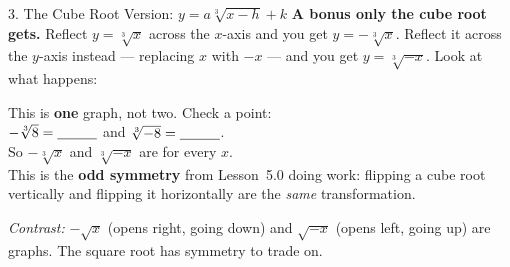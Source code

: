\documentclass[10pt]{article}
\newcommand{\lgrid}[4]{%
  \draw[step=1, linegray!40, very thin] (#1,#3) grid (#2,#4);
  \draw[->, semithick, charcoal] (#1,0)--(#2,0) node[below right, font=\scriptsize]{$x$};
  \draw[->, semithick, charcoal] (0,#3)--(0,#4) node[left, font=\scriptsize]{$y$};}
\newcommand{\cbrtplot}[5]{%
  \draw[very thick, forest, domain=#2:#5, samples=70, smooth]
    plot (\x,{(#1)*pow((\x)-(#2),1/3)+(#3)});
  \draw[very thick, forest, domain=#4:#2, samples=70, smooth]
    plot (\x,{-(#1)*pow((#2)-(\x),1/3)+(#3)});}
\begin{document}
\begin{notesbox}{3. The Cube Root Version: $y=a\sqrt[3]{x-h}+k$}
\vspace{5pt}
\textbf{A bonus only the cube root gets.} Reflect $y=\sqrt[3]{x}$ across the $x$-axis and you get
$y=-\sqrt[3]{x}$. Reflect it across the $y$-axis instead --- replacing $x$ with $-x$ --- and you get
$y=\sqrt[3]{-x}$. Look at what happens:
\begin{center}
\begin{minipage}[c]{0.40\linewidth}
\centering
{}
\end{minipage}
\begin{minipage}[c]{0.56\linewidth}
\small
This is \textbf{one} graph, not two. Check a point: \\[4pt]
$-\sqrt[3]{8}=\blank{1.0cm}$ \quad and \quad $\sqrt[3]{-8}=\blank{1.0cm}$. \\[4pt]
So $-\sqrt[3]{x}$ and $\sqrt[3]{-x}$ are \blank{2.6cm} for every $x$. \\[4pt]
This is the \textbf{odd symmetry} from Lesson~5.0 doing work: flipping a cube root vertically and
flipping it horizontally are the \emph{same} transformation.
\end{minipage}
\end{center}
\emph{Contrast:} $-\sqrt{x}$ (opens right, going down) and $\sqrt{-x}$ (opens left, going up) are
\blank{3.4cm} graphs. The square root has \blank{1.4cm} symmetry to trade on.
\end{notesbox}
\end{document}
